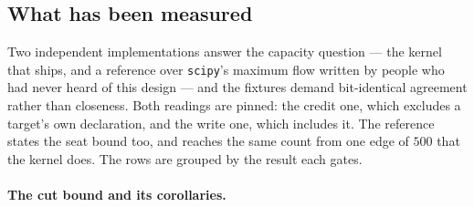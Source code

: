 \subsection{What has been measured}

Two independent implementations answer the capacity question --- the kernel that ships,
and a reference over \texttt{scipy}'s maximum flow written by people who had never heard
of this design --- and the fixtures demand bit-identical agreement rather than closeness.
Both readings are pinned: the credit one, which excludes a target's own declaration, and
the write one, which includes it. The reference states the seat bound too, and reaches the
same count from one edge of $500$ that the kernel does. The rows are grouped by the
result each gates.

\paragraph{The cut bound and its corollaries.}

